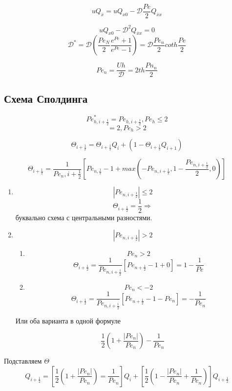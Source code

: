 \documentclass[12pt, a4paper]{article}
\begin{document}
\[ u Q_{\overline{x}} = u Q_{x0} - \mathcal{D} \frac{Pe}{2} Q_{\overline{x}x} \]

\[ u Q_{x0} - \mathcal{D}^2 Q_{\overline{x}x} = 0 \]
\[ \mathcal{D}^* = \mathcal{D} (\frac{{Pe}_N}{2} \frac{e^{Pe} + 1}{e^{Pe}-1}) = \mathcal{D} \frac{{Pe}_n }{2} coth\frac{{Pe}}{2} \]

\[ {Pe}_n = \frac{Uh }{\mathcal{D }} = 2 th \frac{{Pn}_n}{2} \]

\subsection{Схема Сполдинга}

\[ {Pe}^*_{h, i+\frac{1}{2}} = Pe_{h, i+\frac{1}{2}}, {Pe}_h \leq 2 \]
\[ = 2, {Pe}_h > 2 \]

\[ \Theta_{i+\frac{1}{2}} = \Theta_{i+\frac{1}{2}} Q_i + (1 - \Theta_{i+\frac{1}{2}}Q_{i+1})\]

\[ \Theta_{i+\frac{1}{2}} = \frac{1}{{Pe_n, i+\frac{1}{2}}}[{Pe_{n, \frac{1}{2}}}-1+max(- {Pe}_{n, i+\frac{1}{2}}, 1-\frac{{Pe}_{n, i+\frac{1}{2}}}{2}, 0)] \]


\begin{enumerate}
	\item
	\[ |Pe_{n, i+\frac{1}{2}}| \leq 2 \]
	\[ \Theta_{i+\frac{1}{2}} = \frac{1}{2} \Rightarrow \] буквально схема с центральными разностями.
	\item
	\[ |Pe_{n, i+\frac{1}{2}}| > 2 \]

	\begin{enumerate}
	\item
	\[ {Pe}_n > 2 \]
	\[ \Theta_{i+\frac{1}{2}} = \frac{1}{{Pe}_{n, i+\frac{1}{2}}} [{Pe}_{n+\frac{1}{2}} -1 + 0] = 1 - \frac{1}{Pe} \]

	\item
	\[ Pe_{n} < -2 \]
	\[ \Theta_{i+\frac{1}{2}} = \frac{1}{{Pe}_{n, i+\frac{1}{2}}} [{Pe}_{n+\frac{1}{2}} -1 - {Pe}_n] = - \frac{1}{{Pe}_{n}} \]

	\end{enumerate}
	Или оба варианта в одной формуле

	\[ \frac{1}{2}(1+ \frac{|{Pe}_n|}{{Pe}_n}) - \frac{1}{{Pe}_n} \]

\end{enumerate}

Подставляем $ \Theta $
\[ Q_{i+\frac{1}{2}} = [ \frac{1}{2} (1 + \frac{|{Pe}_n|}{{Pe}_n}) = \frac{1}{{Pe}_n}] Q_i + [\frac{1}{2} (1 - \frac{|{Pe}_n|}{{Pe}_n} + \frac{1}{{Pe}_n })]Q_{i+\frac{1}{2}} \]
\end{document}
